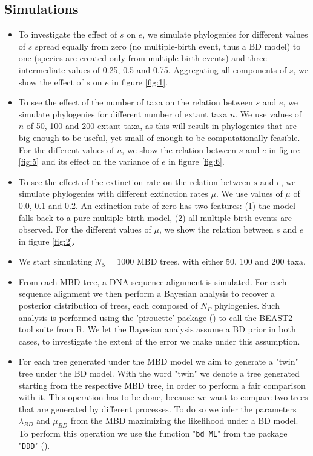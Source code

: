 \subsection{Simulations}
\begin{itemize}

\item To investigate the effect of $s$ on $e$, we simulate phylogenies
for different values of $s$ spread equally from zero (no multiple-birth
event, thus a BD model) to one (species are created only from multiple-birth
events) and three intermediate values of 0.25, 0.5 and 0.75. Aggregating all
components of $s$, we show the effect of $s$ on $e$ in figure \ref{fig:1}.

\item To see the effect of the number of taxa on the relation 
between $s$ and $e$, we simulate phylogenies
for different number of extant taxa $n$. We use values of $n$
of 50, 100 and 200 extant taxa, as this will result in phylogenies
that are big enough to be useful, yet small of enough to
be computationally feasible. For the different values of $n$, we show
the relation between $s$ and $e$ in figure \ref{fig:5} and its effect
on the variance of $e$ in figure \ref{fig:6}.

\item To see the effect of the extinction rate on the relation 
between $s$ and $e$, we simulate phylogenies
with different extinction rates $\mu$. We use values of $\mu$
of 0.0, 0.1 and 0.2. An extinction rate of zero has two features:
(1) the model falls back to a pure multiple-birth model, 
(2) all multiple-birth events are observed.
For the different values of $\mu$, we show
the relation between $s$ and $e$ in figure \ref{fig:2}.

\item We start simulating $N_{S} = 1000$ MBD trees,
with either 50, 100 and 200 taxa.

\item From each MBD tree, a DNA sequence alignment is simulated. 
For each sequence alignment we then perform a Bayesian analysis 
to recover a posterior distribution of trees, 
each composed of $N_{P}$ phylogenies. 
Such analysis is performed using 
the 'pirouette' package (\cite{pirouette}) to call the BEAST2 tool 
suite from R. 
We let the Bayesian analysis assume a BD prior in both cases, 
to investigate the extent of the error we make under this assumption.

\item For each tree generated under the MBD model 
we aim to generate a "twin" tree under the BD model. 
With the word "twin" 
we denote a tree generated starting from the respective MBD tree, 
in order to perform a fair comparison with it. 
This operation has to be done, 
because we want to compare two trees 
that are generated by different processes. 
To do so we infer the parameters $\lambda_{BD}$ and $\mu_{BD}$ 
from the MBD maximizing the likelihood under a BD model. 
To perform this operation we use the function "\texttt{bd\_ML}" 
from the package "\texttt{DDD}" (\cite{etienne2012diversity}). 


\end{itemize}
